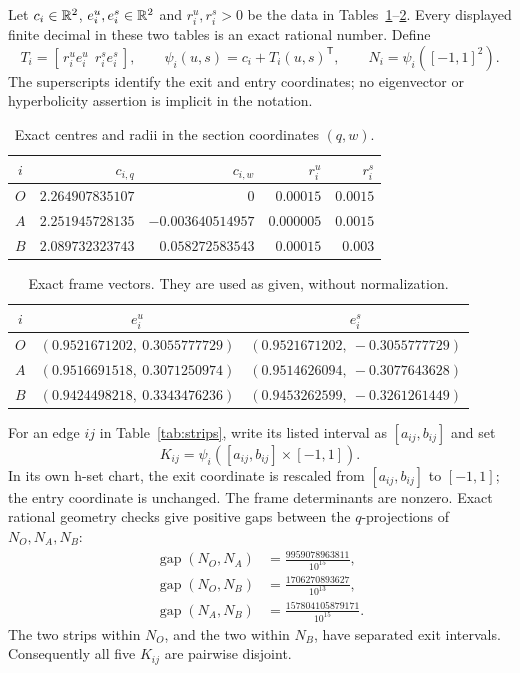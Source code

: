 Let $c_i\in\mathbb R^2$, $e_i^u,e_i^s\in\mathbb R^2$ and $r_i^u,r_i^s>0$ be the data in
Tables~\ref{tab:centres}--\ref{tab:frames}. Every displayed finite decimal in
these two tables is an exact rational number. Define
\begin{equation}\label{eq:chart}
 T_i=[\,r_i^u e_i^u\ \ r_i^s e_i^s\,],\qquad
 \psi_i(u,s)=c_i+T_i(u,s)^{\mathsf T},\qquad
 N_i=\psi_i([-1,1]^2).
\end{equation}
The superscripts identify the exit and entry coordinates; no eigenvector or
hyperbolicity assertion is implicit in the notation.

\begin{table}[ht]
\centering\small
\begin{tabular}{@{}c rr rr@{}}\toprule
$i$ & $c_{i,q}$ & $c_{i,w}$ & $r_i^u$ & $r_i^s$\\\midrule
$O$ & $2.264907835107$ & $0$ & $0.00015$ & $0.0015$\\
$A$ & $2.251945728135$ & $-0.003640514957$ & $0.000005$ & $0.0015$\\
$B$ & $2.089732323743$ & $0.058272583543$ & $0.00015$ & $0.003$\\\bottomrule
\end{tabular}
\caption{Exact centres and radii in the section coordinates $(q,w)$.}
\label{tab:centres}
\end{table}

\begin{table}[ht]
\centering\small
\begin{tabular}{@{}c cc@{}}\toprule
$i$ & $e_i^u$ & $e_i^s$\\\midrule
$O$ & $(0.9521671202,\ 0.3055777729)$ & $(0.9521671202,\ -0.3055777729)$\\
$A$ & $(0.9516691518,\ 0.3071250974)$ & $(0.9514626094,\ -0.3077643628)$\\
$B$ & $(0.9424498218,\ 0.3343476236)$ & $(0.9453262599,\ -0.3261261449)$\\\bottomrule
\end{tabular}
\caption{Exact frame vectors. They are used as given, without normalization.}
\label{tab:frames}
\end{table}

For an edge $ij$ in Table~\ref{tab:strips}, write its listed interval as
$[a_{ij},b_{ij}]$ and set
\[
 K_{ij}=\psi_i([a_{ij},b_{ij}]\times[-1,1]).
\]
In its own h-set chart, the exit coordinate is rescaled from
$[a_{ij},b_{ij}]$ to $[-1,1]$; the entry coordinate is unchanged.
The frame determinants are nonzero. Exact rational geometry checks give
positive gaps between the $q$-projections of $N_O,N_A,N_B$:
\[
 \begin{aligned}
 \operatorname{gap}(N_O,N_A)&=\frac{9959078963811}{10^{15}},\\
 \operatorname{gap}(N_O,N_B)&=\frac{1706270893627}{10^{13}},\\
 \operatorname{gap}(N_A,N_B)&=\frac{157804105879171}{10^{15}}.
 \end{aligned}
\]
The two strips within $N_O$, and the two within $N_B$, have separated exit
intervals. Consequently all five $K_{ij}$ are pairwise disjoint.

